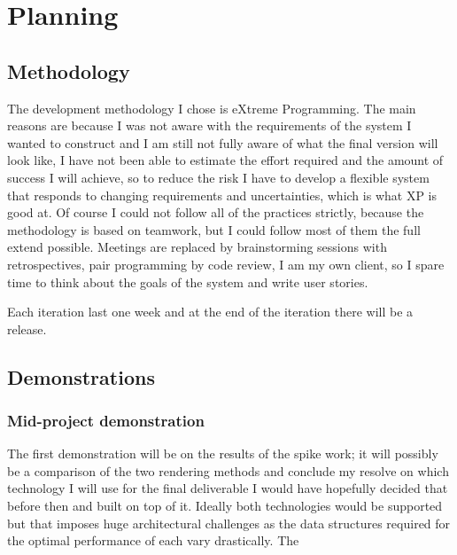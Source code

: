 \documentclass[11pt,fleqn,twoside]{article}
\begin{document}
\section{Planning}

\subsection{Methodology}

The development methodology I chose is eXtreme Programming. The main reasons are because I was not aware with the requirements of the system I wanted to construct and I am still not fully aware of what the final version will look like, I have not been able to estimate the effort required and the amount of success I will achieve, so to reduce the risk I have to develop a flexible system that responds to changing requirements and uncertainties, which is what XP is good at. Of course I could not follow all of the practices strictly, because the methodology is based on teamwork, but I could follow most of them the full extend possible.
Meetings are replaced by brainstorming sessions with retrospectives, pair programming by code review, I am my own client, so I spare time to think about the goals of the system and write user stories.

Each iteration last one week and at the end of the iteration there will be a release.

\subsection{Demonstrations}

\subsubsection{Mid-project demonstration}
The first demonstration will be on the results of the spike work; it will possibly be a comparison of the two rendering methods and conclude my resolve on which technology I will use for the final deliverable I would have hopefully decided that before then and built on top of it. Ideally both technologies would be supported but that imposes huge architectural challenges as the data structures required for the optimal performance of each vary drastically.
The 
\end{document}
